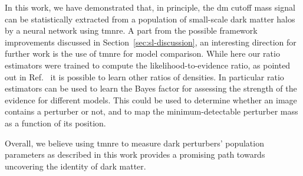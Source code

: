 
\mbox{}

In this work, we have demonstrated that, in principle, the \gls*{dm} cutoff mass signal can be statistically extracted from a population of small-scale dark matter halos by a neural network using \gls*{tmnre}.
A part from the possible framework improvements discussed in Section~\ref{sec:sl-discussion}, an interesting direction for further work is the use of \gls*{tmnre} for model comparison. While here our ratio estimators were trained to compute the likelihood-to-evidence ratio, as pointed out in Ref.~\cite{Hermans:2019ioj} it is possible to learn other ratios of densities. In particular ratio estimators can be used to learn the Bayes factor for assessing the strength of the evidence for different models. This could be used to determine whether an image contains a perturber or not, and to map the minimum-detectable perturber mass as a function of its position.

Overall, we believe using \gls*{tmnre} to measure dark perturbers' population parameters as described in this work provides a promising path towards uncovering the identity of dark matter.





